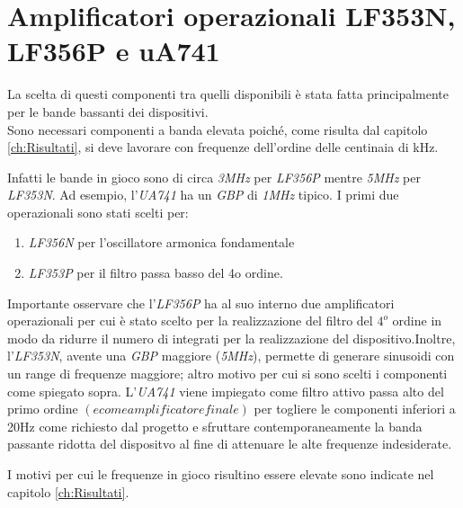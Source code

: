 \documentclass[titlepage]{report}
\begin{document}
	
\section{Amplificatori operazionali LF353N, LF356P e uA741}
\label{sec:OpAmp}
	La scelta di questi componenti tra quelli disponibili è stata fatta principalmente per le bande bassanti dei dispositivi.
	\\ Sono necessari componenti a banda elevata poiché, come risulta dal capitolo \ref{ch:Risultati}, si deve lavorare con frequenze dell'ordine delle centinaia di kHz.
	
	 \noindent Infatti le bande in gioco sono di circa \textit{3MHz} per \textit{LF356P} mentre \textit{5MHz} per \textit{LF353N}. Ad esempio, l'\textit{UA741} ha un \textit{GBP} di \textit{1MHz} tipico. I primi due operazionali sono stati scelti per:
	
	\begin{enumerate}
		\item \textit{LF356N} per l'oscillatore armonica fondamentale 
		\item \textit{LF353P} per il filtro passa basso del 4o ordine. 
	\end{enumerate}
	
	
	\noindent Importante osservare che l'\textit{LF356P} ha al suo interno due amplificatori operazionali per cui è stato scelto per la realizzazione del filtro del $4^{o}$ ordine in modo da ridurre il numero di integrati per la realizzazione del dispositivo.Inoltre, l'\textit{LF353N}, avente una \textit{GBP} maggiore (\textit{5MHz}), permette di generare sinusoidi con un range di frequenze maggiore; altro motivo per cui si sono scelti i componenti come spiegato sopra.
	L'\textit{UA741} viene impiegato come filtro attivo passa alto del primo ordine $(e come amplificatore finale)$ per togliere le componenti inferiori a 20Hz come richiesto dal progetto e sfruttare contemporaneamente la banda passante ridotta del dispositvo al fine di attenuare le alte frequenze indesiderate.

	\noindent I motivi per cui le frequenze in gioco risultino essere elevate sono indicate nel capitolo \ref{ch:Risultati}.

	
\end{document}
